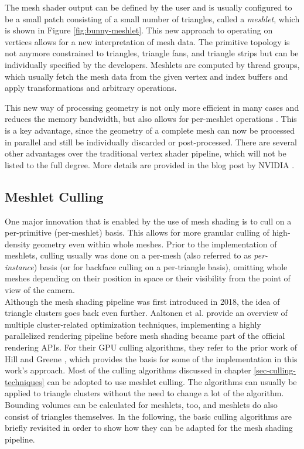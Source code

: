 \noindent
The mesh shader output can be defined by the user and is usually configured to be a small patch consisting of a small 
number of triangles, called a \emph{meshlet}, which is shown in Figure \ref{fig:bunny-meshlet}. This new approach 
to operating on vertices allows for a new interpretation of mesh data. The primitive topology is not anymore constrained 
to triangles, triangle fans, and triangle strips but can be individually specified by the developers.
Meshlets are computed by thread groups, which usually fetch the mesh data from the given vertex and index buffers and 
apply transformations and arbitrary operations. \\
\enlargethispage{\baselineskip}

\noindent
This new way of processing geometry is not only more efficient in many cases and reduces the memory bandwidth, but 
also allows for per-meshlet operations \cite{Kubisch2020}. This is a key advantage, since the geometry of a 
complete mesh can now be processed in parallel and still be individually discarded or post-processed. There are 
several other advantages over the traditional vertex shader pipeline, which will not be listed to the full degree. 
More details are provided in the blog post by NVIDIA \cite{Kubisch2020}.\\


\subsection*{Meshlet Culling} \label{subsec-meshlet-culling}

One major innovation that is enabled by the use of mesh shading is to cull on a per-primitive (per-meshlet) basis. 
This allows for more granular culling of high-density geometry even within whole meshes. Prior to the implementation 
of meshlets, culling usually was done on a per-mesh (also referred to as \emph{per-instance}) basis (or for backface 
culling on a per-triangle basis), omitting whole meshes depending on their position in space or their visibility from 
the point of view of the camera.\\

\noindent
Although the mesh shading pipeline was first introduced in 2018, the idea of triangle clusters goes back even further.
Aaltonen et al. \cite{Aaltonen2015} provide an overview of multiple cluster-related optimization techniques, implementing 
a highly parallelized rendering pipeline before mesh shading became part of the official rendering \ac{API}s.
For their \ac{GPU} culling algorithms, they refer to the prior work of Hill \cite{Hill11} and Greene \cite{Greene93}, which 
provides the basis for some of the implementation in this work's approach. Most of the culling algorithms discussed in chapter 
\ref{sec-culling-techniques} can be adopted to use meshlet culling. The algorithms can usually be applied to triangle clusters 
without the need to change a lot of the algorithm. Bounding volumes can be calculated for meshlets, too, and meshlets do also 
consist of triangles themselves. In the following, the basic culling algorithms are briefly revisited in order to show how they 
can be adapted for the mesh shading pipeline.


